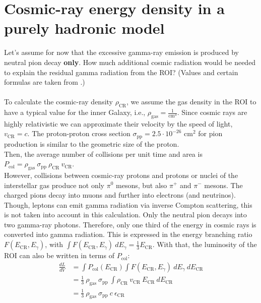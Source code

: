 \documentclass[a4paper]{article}
\begin{document}
\section{Cosmic-ray energy density in a purely hadronic model}
Let's assume for now that the excessive gamma-ray emission is produced by neutral pion decay \textbf{only}. How much additional cosmic radiation would be needed to explain the residual gamma radiation from the ROI? (Values and certain formulas are taken from \cite{Longair}.)\\
\\
To calculate the cosmic-ray density $\rho_{\text{CR}}$, we assume the gas density in the ROI to have a typical value for the inner Galaxy, i.e., $\rho_\text{gas} = \frac{1}{\text{cm}^3}$. Since cosmic rays are highly relativistic we can approximate their velocity by the speed of light, $v_\text{CR} = c$. The proton-proton cross section $\sigma_\text{pp} = 2.5 \cdot 10^{-26}$ cm$^2$ for pion production is similar to the geometric size of the proton.\\
Then, the average number of collisions per unit time and area is $P_\text{col} = \rho_{\text{gas}}\ \sigma_{\text{pp}}\ \rho_{\text{CR}}\ v_{\text{CR}}$.\\
However, collisions between cosmic-ray protons and protons or nuclei of the interstellar gas produce not only $\pi^0$ mesons, but also $\pi^+$ and $\pi^-$ mesons. The charged pions decay into muons and further into electrons (and neutrinos). Though, leptons can emit gamma radiation via inverse Compton scattering, this is not taken into account in this calculation. Only the neutral pion decays into two gamma-ray photons. Therefore, only one third of the energy in cosmic rays is converted into gamma radiation. This is expressed in the energy branching ratio $F(E_{\text{CR}}, E_\gamma)$, with $\int F(E_{\text{CR}}, E_\gamma)\ dE_\gamma = \frac{1}{3}E_\text{CR}$.
With that, the luminosity of the ROI can also be written in terms of $P_\text{col}$:
\begin{equation}
\begin{split}
\frac{dL}{dV} &= \int P_\text{col}(E_{\text{CR}}) \int F(E_{\text{CR}}, E_\gamma)\ dE_\gamma\ dE_{\text{CR}}\\
&= \frac{1}{3}\ \rho_{\text{gas}}\ \sigma_{\text{pp}}\ \int \rho_{\text{CR}}\ v_{\text{CR}}\ E_{\text{CR}}\ dE_{\text{CR}}\\
&= \frac{1}{3}\ \rho_{\text{gas}}\ \sigma_{\text{pp}}\ c\ \epsilon_{\text{CR}}
\end{split}
\end{equation}
\end{document}
